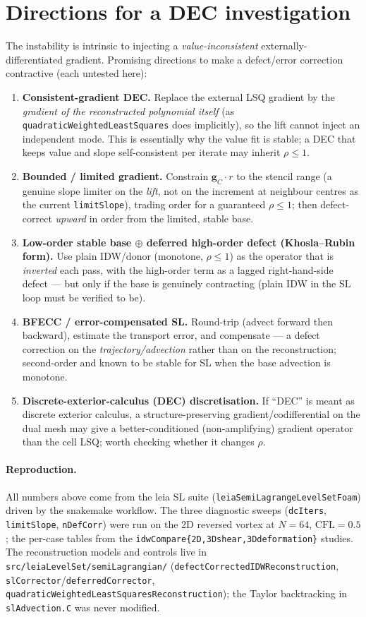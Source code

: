 \documentclass[11pt]{article}
\newcommand{\code}[1]{\texttt{#1}}
\begin{document}
\section{Directions for a DEC investigation}
The instability is intrinsic to injecting a \emph{value-inconsistent}
externally-differentiated gradient. Promising directions to make a defect/error
correction contractive (each untested here):
\begin{enumerate}
\item \textbf{Consistent-gradient DEC.} Replace the external LSQ gradient by the
\emph{gradient of the reconstructed polynomial itself} (as \code{quadraticWeightedLeastSquares}
does implicitly), so the lift cannot inject an independent mode. This is essentially
why the value fit is stable; a DEC that keeps value and slope self-consistent per
iterate may inherit $\rho\le1$.
\item \textbf{Bounded / limited gradient.} Constrain $\mathbf{g}_C\!\cdot r$ to the
stencil range (a genuine slope limiter on the \emph{lift}, not on the increment at
neighbour centres as the current \code{limitSlope}), trading order for a guaranteed
$\rho\le1$; then defect-correct \emph{upward} in order from the limited, stable base.
\item \textbf{Low-order stable base $\oplus$ deferred high-order defect
(Khosla--Rubin form).} Use plain IDW/donor (monotone, $\rho\le1$) as the operator
that is \emph{inverted} each pass, with the high-order term as a lagged
right-hand-side defect --- but only if the base is genuinely contracting (plain IDW
in the SL loop must be verified to be).
\item \textbf{BFECC / error-compensated SL.} Round-trip (advect forward then
backward), estimate the transport error, and compensate --- a defect correction on
the \emph{trajectory/advection} rather than on the reconstruction; second-order and
known to be stable for SL when the base advection is monotone.
\item \textbf{Discrete-exterior-calculus (DEC) discretisation.} If ``DEC'' is meant
as discrete exterior calculus, a structure-preserving gradient/codifferential on the
dual mesh may give a better-conditioned (non-amplifying) gradient operator than the
cell LSQ; worth checking whether it changes $\rho$.
\end{enumerate}

\paragraph{Reproduction.} All numbers above come from the leia SL suite
(\code{leiaSemiLagrangeLevelSetFoam}) driven by the snakemake workflow. The three
diagnostic sweeps (\code{dcIters}, \code{limitSlope}, \code{nDefCorr}) were run on
the 2D reversed vortex at $N{=}64$, $\mathrm{CFL}=0.5$; the per-case tables from the
\code{idwCompare\{2D,3Dshear,3Ddeformation\}} studies. The reconstruction models and
controls live in \code{src/leiaLevelSet/semiLagrangian/}
(\code{defectCorrectedIDWReconstruction}, \code{slCorrector}/\code{deferredCorrector},
\code{quadraticWeightedLeastSquaresReconstruction}); the Taylor backtracking in
\code{slAdvection.C} was never modified.
\end{document}
